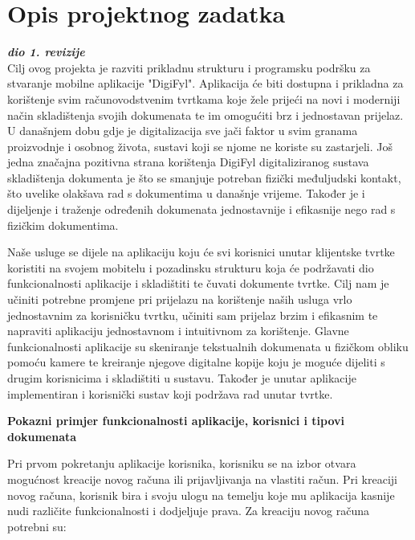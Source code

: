 \chapter{Opis projektnog zadatka}
		
		\textbf{\textit{dio 1. revizije}}\\
		
	
		
		
	
		
		
		Cilj ovog projekta je razviti prikladnu strukturu i programsku podršku za stvaranje mobilne aplikacije "DigiFyl".
		Aplikacija će biti dostupna i prikladna za korištenje svim računovodstvenim tvrtkama koje žele prijeći na novi i moderniji način skladištenja svojih dokumenata te im omogućiti brz i jednostavan prijelaz.
		U današnjem dobu gdje je digitalizacija sve jači faktor u svim granama proizvodnje i osobnog života, sustavi koji se njome ne koriste su zastarjeli. Još jedna značajna pozitivna strana korištenja DigiFyl digitaliziranog sustava skladištenja dokumenta je što se smanjuje potreban fizički međuljudski kontakt, što uvelike olakšava rad s dokumentima u današnje vrijeme. Također je i dijeljenje i traženje određenih dokumenata jednostavnije i efikasnije nego rad s fizičkim dokumentima.
		
		Naše usluge se dijele na aplikaciju koju će svi korisnici unutar klijentske tvrtke koristiti na svojem mobitelu i pozadinsku strukturu koja će podržavati dio funkcionalnosti aplikacije i skladištiti te čuvati dokumente tvrtke. Cilj nam je učiniti potrebne promjene pri prijelazu na korištenje naših usluga vrlo jednostavnim za korisničku tvrtku, učiniti sam prijelaz brzim i efikasnim te napraviti aplikaciju jednostavnom i intuitivnom za korištenje. Glavne funkcionalnosti aplikacije su skeniranje tekstualnih dokumenata u fizičkom obliku pomoću kamere te kreiranje njegove digitalne kopije koju je moguće dijeliti s drugim korisnicima i skladištiti u sustavu. Također je unutar aplikacije implementiran i korisnički sustav koji podržava rad unutar tvrtke.
		
		
		\medskip
		\textbf{Pokazni primjer funkcionalnosti aplikacije, korisnici i tipovi dokumenata}
		\medskip
		
		
		 Pri prvom pokretanju aplikacije korisnika, korisniku se na izbor otvara mogućnost kreacije novog računa ili prijavljivanja na vlastiti račun. Pri kreaciji novog računa, korisnik bira i svoju ulogu na temelju koje mu aplikacija kasnije nudi različite funkcionalnosti i dodjeljuje prava. Za kreaciju novog računa potrebni su:
				
